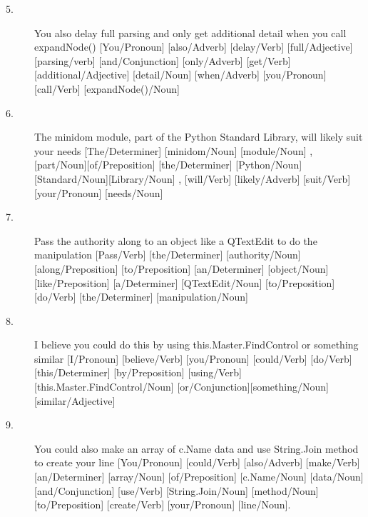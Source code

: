 \documentclass{sig-alternate-05-2015}
\begin{document}
\begin{description}
\item[5.]
You also delay full parsing and only get additional detail when you call expandNode() \linebreak
{[You/Pronoun]} [also/Adverb] [delay/Verb] \linebreak 
{[full/Adjective]}{[parsing/verb]} {[and/Conjunction]}\linebreak
{ [only/Adverb]} [get/Verb] {[additional/Adjective]} \linebreak
{[detail/Noun]} [when/Adverb] {[you/Pronoun]} \linebreak
{[call/Verb]} [expandNode()/Noun]

\item[6.]
The minidom module, part of the Python Standard Library, will likely suit your needs \linebreak
{[The/Determiner]} [minidom/Noun] [module/Noun] , \linebreak
{[part/Noun]}{[of/Preposition]} [the/Determiner] \linebreak
{[Python/Noun]}{[Standard/Noun]}{[Library/Noun]} ,\linebreak
{[will/Verb]} [likely/Adverb] [suit/Verb] \linebreak
{[your/Pronoun]} [needs/Noun]


\item[7.]
Pass the authority along to an object like a QTextEdit to do the manipulation \linebreak
{[Pass/Verb]} [the/Determiner] [authority/Noun] \linebreak
{[along/Preposition]} [to/Preposition] [an/Determiner] \linebreak
{[object/Noun]} [like/Preposition] [a/Determiner] \linebreak
{[QTextEdit/Noun]} [to/Preposition] [do/Verb] \linebreak
{[the/Determiner]} [manipulation/Noun]

\item[8.]
I believe you could do this by using this.Master.FindControl or something similar \linebreak
{[I/Pronoun]} [believe/Verb] [you/Pronoun] [could/Verb] \linebreak
{[do/Verb]} [this/Determiner] [by/Preposition] \linebreak
{[using/Verb]} [this.Master.FindControl/Noun] \linebreak
{[or/Conjunction]}[something/Noun] [similar/Adjective]

\item[9.]
You could also make an array of c.Name data and use String.Join method to create your line \linebreak
{[You/Pronoun]} [could/Verb] [also/Adverb] [make/Verb]\linebreak
{[an/Determiner]} [array/Noun] [of/Preposition]\linebreak
{[c.Name/Noun]} [data/Noun] [and/Conjunction] \linebreak
{[use/Verb]} [String.Join/Noun] [method/Noun] \linebreak
{[to/Preposition]} [create/Verb] [your/Pronoun] [line/Noun].


\end{description}
\end{document}
